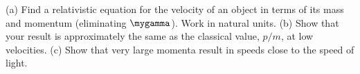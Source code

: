 (a) Find a relativistic equation for the velocity of an
object in terms of its mass and momentum (eliminating $\mygamma$).
Work in natural units. \answercheck\hwendpart
(b) Show that your result is
approximately the same as the classical value, $p/m$, at low
velocities. \hwendpart
(c) Show that very large momenta result in
speeds close to the speed of light.
